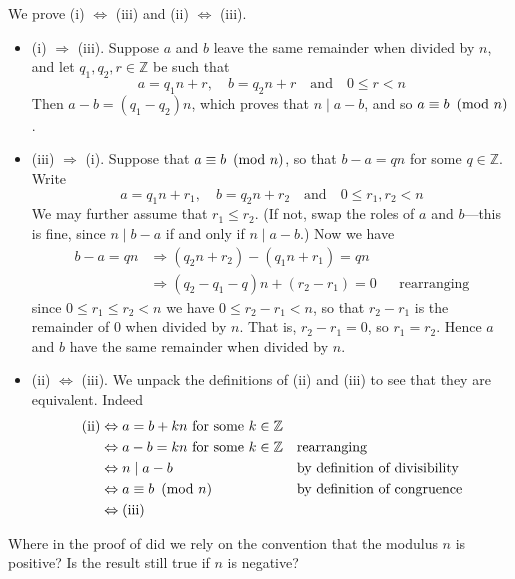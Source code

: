 \begin{cproof}
We prove (i) $\Leftrightarrow$ (iii) and (ii) $\Leftrightarrow$ (iii).
\begin{itemize}
\item (i) $\Rightarrow$ (iii). Suppose $a$ and $b$ leave the same remainder when divided by $n$, and let $q_1,q_2,r \in \mathbb{Z}$ be such that
\[ a=q_1n+r, \quad b = q_2n+r \quad \text{and} \quad 0 \le r < n \]
Then $a-b = (q_1-q_2)n$, which proves that $n \mid a-b$, and so $a \equiv b ~\left(\text{mod}~n\right)$.
\item (iii) $\Rightarrow$ (i). Suppose that $a \equiv b ~\left(\text{mod}~n\right)$, so that $b-a = qn$ for some $q \in \mathbb{Z}$. Write
\[ a=q_1n+r_1, \quad b = q_2n+r_2 \quad \text{and} \quad 0 \le r_1,r_2 < n \]
We may further assume that $r_1 \le r_2$. (If not, swap the roles of $a$ and $b$---this is fine, since $n \mid b-a$ if and only if $n \mid a-b$.) Now we have
\begin{align*}
b-a = qn & \Rightarrow (q_2n+r_2) - (q_1n+r_1) = qn && \\
& \Rightarrow (q_2-q_1-q)n + (r_2-r_1) = 0 && \text{rearranging}
\end{align*}
since $0 \le r_1 \le r_2 < n$ we have $0 \le r_2-r_1 < n$, so that $r_2-r_1$ is the remainder of $0$ when divided by $n$. That is, $r_2-r_1=0$, so $r_1=r_2$. Hence $a$ and $b$ have the same remainder when divided by $n$.
\item (ii) $\Leftrightarrow$ (iii). We unpack the definitions of (ii) and (iii) to see that they are equivalent. Indeed
\begin{align*}
\text{(ii)} &\Leftrightarrow a=b+kn \text{ for some $k \in \mathbb{Z}$} && \\
&\Leftrightarrow a-b=kn \text{ for some $k \in \mathbb{Z}$} && \text{rearranging} \\
&\Leftrightarrow n \mid a-b && \text{by definition of divisibility} \\
&\Leftrightarrow a \equiv b ~\left(\text{mod}~n\right) && \text{by definition of congruence} \\
&\Leftrightarrow \text{(iii)} &&
\end{align*}
\end{itemize}
\end{cproof}

\begin{discussion}
Where in the proof of  did we rely on the convention that the modulus $n$ is positive? Is the result still true if $n$ is negative?
\end{discussion}

